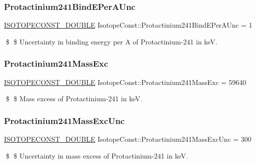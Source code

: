 \subsubsection{\texorpdfstring{Protactinium241\+Bind\+E\+Per\+A\+Unc}{Protactinium241BindEPerAUnc}}
{\footnotesize\ttfamily \mbox{\hyperlink{group___isotope_const-_macros_ga8f45a7272ce02c0b4c65c44636ed719a}{I\+S\+O\+T\+O\+P\+E\+C\+O\+N\+S\+T\+\_\+\+D\+O\+U\+B\+LE}} Isotope\+Const\+::\+Protactinium241\+Bind\+E\+Per\+A\+Unc = 1}

\$ \$ Uncertainty in binding energy per A of Protactinium-\/241 in keV. \mbox{\label{group___isotope_const-_protactinium-_pa241_ga80c3dda72c91b2072f796718167b7811}} 
\subsubsection{\texorpdfstring{Protactinium241\+Mass\+Exc}{Protactinium241MassExc}}
{\footnotesize\ttfamily \mbox{\hyperlink{group___isotope_const-_macros_ga8f45a7272ce02c0b4c65c44636ed719a}{I\+S\+O\+T\+O\+P\+E\+C\+O\+N\+S\+T\+\_\+\+D\+O\+U\+B\+LE}} Isotope\+Const\+::\+Protactinium241\+Mass\+Exc = 59640}

\$ \$ Mass excess of Protactinium-\/241 in keV. \mbox{\label{group___isotope_const-_protactinium-_pa241_gafe243e933265bdfe5fff0a468d18b00f}} 
\subsubsection{\texorpdfstring{Protactinium241\+Mass\+Exc\+Unc}{Protactinium241MassExcUnc}}
{\footnotesize\ttfamily \mbox{\hyperlink{group___isotope_const-_macros_ga8f45a7272ce02c0b4c65c44636ed719a}{I\+S\+O\+T\+O\+P\+E\+C\+O\+N\+S\+T\+\_\+\+D\+O\+U\+B\+LE}} Isotope\+Const\+::\+Protactinium241\+Mass\+Exc\+Unc = 300}

\$ \$ Uncertainty in mass excess of Protactinium-\/241 in keV. \mbox{\label{group___isotope_const-_protactinium-_pa241_ga96848d089fc9546639a6c1897e31b6eb}} 
